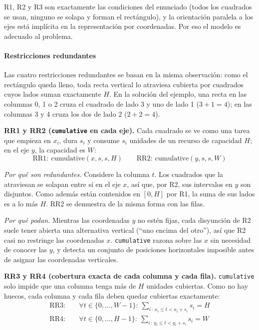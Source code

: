 R1, R2 y R3 son exactamente las condiciones del enunciado (todos los cuadrados se usan, ninguno se solapa y forman el rectángulo), y la orientación paralela a los ejes está implícita en la representación por coordenadas. Por eso el modelo es adecuado al problema.

\paragraph{Restricciones redundantes}

Las cuatro restricciones redundantes se basan en la misma observación: como el rectángulo queda lleno, toda recta vertical lo atraviesa cubierta por cuadrados cuyos lados suman exactamente $H$. En la solución del ejemplo, una recta en las columnas 0, 1 o 2 cruza el cuadrado de lado 3 y uno de lado 1 ($3 + 1 = 4$); en las columnas 3 y 4 cruza los dos de lado 2 ($2 + 2 = 4$).

\textbf{RR1 y RR2 (\texttt{cumulative} en cada eje).} Cada cuadrado se ve como una tarea que empieza en $x_i$, dura $s_i$ y consume $s_i$ unidades de un recurso de capacidad $H$; en el eje $y$, la capacidad es $W$:
\[
    \mathrm{RR1}:\ \mathrm{cumulative}(x, s, s, H) \qquad \mathrm{RR2}:\ \mathrm{cumulative}(y, s, s, W)
\]

\textit{Por qué son redundantes.} Considere la columna $t$. Los cuadrados que la atraviesan se solapan entre sí en el eje $x$, así que, por R2, sus intervalos en $y$ son disjuntos. Como además están contenidos en $[0, H]$ por R1, la suma de sus lados es a lo más $H$. RR2 se demuestra de la misma forma con las filas.

\textit{Por qué podan.} Mientras las coordenadas $y$ no estén fijas, cada disyunción de R2 suele tener abierta una alternativa vertical (\enquote{uno encima del otro}), así que R2 casi no restringe las coordenadas $x$. \texttt{cumulative} razona sobre las $x$ sin necesidad de conocer las $y$, y detecta un conjunto de posiciones horizontales imposible antes de asignar las coordenadas verticales.

\textbf{RR3 y RR4 (cobertura exacta de cada columna y cada fila).} \texttt{cumulative} solo impide que una columna tenga más de $H$ unidades cubiertas. Como no hay huecos, cada columna y cada fila deben quedar cubiertas exactamente:
\begin{align*}
    \mathrm{RR3}: & \quad \forall t \in \{0, \dots, W - 1\}:\ \sum_{i \,:\, x_i \le t < x_i + s_i} s_i = H \\
    \mathrm{RR4}: & \quad \forall t \in \{0, \dots, H - 1\}:\ \sum_{i \,:\, y_i \le t < y_i + s_i} s_i = W
\end{align*}

